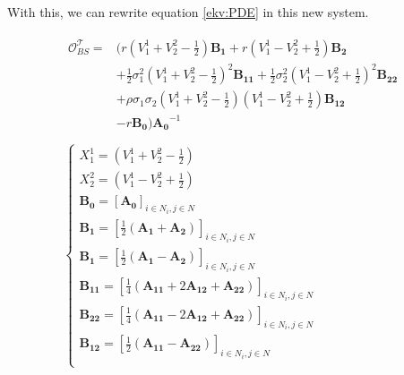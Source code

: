 \documentclass[a4paper]{article}      %
\begin{document}
With this, we can rewrite equation \ref{ekv:PDE} in this new system.

\begin{gather}
\begin{aligned}
 \mathcal{O}_{BS}^\mathcal{T} =& \Big( r(V_1^1 + V_2^2 - \frac{1}{2}) \mathbf{B_1} + r(V_1^1 - V_2^2 + \frac{1}{2}) \mathbf{B_2} \\
&+ \frac{1}{2} \sigma_1^2 (V_1^1 + V_2^2 - \frac{1}{2})^2 \mathbf{B_{11}} 
+ \frac{1}{2} \sigma_2^2 (V_1^1 - V_2^2 + \frac{1}{2})^2 \mathbf{B_{22}} \\
&+ \rho \sigma_1 \sigma_2 (V_1^1 + V_2^2 - \frac{1}{2}) (V_1^1 - V_2^2 + \frac{1}{2}) \mathbf{B_{12}} \\
& - r\mathbf{B_0} \Big) \mathbf{A_0}^{-1} \\
\end{aligned} \label{ekv:OTransform}
\\
\begin{cases}
X_1^1 = (V_1^1 + V_2^2 - \frac{1}{2}) \\
X_2^2 = (V_1^1 - V_2^2 + \frac{1}{2}) \\
\mathbf{B_0} = [\mathbf{A_0}]_{i\in N_{i},j \in N} \\
\mathbf{B_1} = [\frac{1}{2}(\mathbf{A_1} + \mathbf{A_2})]_{i\in N_{i},j \in N} \\
\mathbf{B_1} = [\frac{1}{2}(\mathbf{A_1} - \mathbf{A_2})]_{i\in N_{i},j \in N} \\
\mathbf{B_{11}} = [\frac{1}{4}(\mathbf{A_{11}} + 2\mathbf{A_{12}} + \mathbf{A_{22}})]_{i\in N_{i},j \in N} \\
\mathbf{B_{22}} = [\frac{1}{4}(\mathbf{A_{11}} - 2\mathbf{A_{12}} + \mathbf{A_{22}})]_{i\in N_{i},j \in N} \\
\mathbf{B_{12}} = [\frac{1}{2}(\mathbf{A_{11}} - \mathbf{A_{22}})]_{i\in N_{i},j \in N} \\
\end{cases}
\label{ekv:BTransform}
\end{gather}
\end{document}
